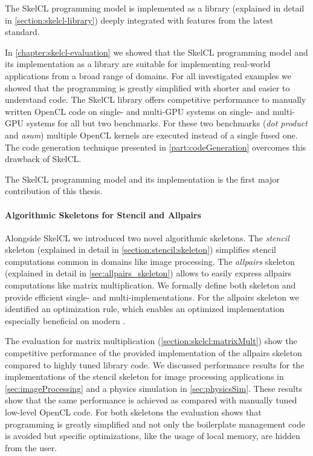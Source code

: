 \noindent
The SkelCL programming model is implemented as a \Cpp library (explained in detail in \autoref{section:skelcl-library}) deeply integrated with features from the latest \Cpp standard.

In \autoref{chapter:skelcl-evaluation} we showed that the SkelCL programming model and its implementation as a \Cpp library are suitable for implementing real-world applications from a broad range of domains.
For all investigated examples we showed that the programming is greatly simplified with shorter and easier to understand code.
The SkelCL library offers competitive performance to manually written OpenCL code on single- and multi-GPU systems on single- and multi-GPU systems for all but two benchmarks.
For these two benchmarks (\emph{dot product} and \emph{asum}) multiple OpenCL kernels are executed instead of a single fused one.
The code generation technique presented in \autoref{part:codeGeneration} overcomes this drawback of SkelCL.

\bigskip
The SkelCL programming model and its implementation is the first major contribution of this thesis.

\paragraph{Algorithmic Skeletons for Stencil and Allpairs}
Alongside SkelCL we introduced two novel algorithmic skeletons.
The \emph{stencil} skeleton (explained in detail in \autoref{section:stencil:skeleton}) simplifies stencil computations common in domains like image processing.
The \emph{allpairs} skeleton (explained in detail in \autoref{sec:allpairs_skeleton}) allows to easily express allpairs computations like matrix multiplication.
We formally define both skeleton and provide efficient single- and multi-\GPU implementations.
For the allpairs skeleton we identified an optimization rule, which enables an optimized implementation especially beneficial on modern \GPUs.

The evaluation for matrix multiplication (\autoref{section:skelcl:matrixMult}) show the competitive performance of the provided implementation of the allpairs skeleton compared to highly tuned library code.
We discussed performance results for the implementations of the stencil skeleton for image processing applications in \autoref{sec:imageProcessing} and a physics simulation in \autoref{sec:physicsSim}.
These results show that the same performance is achieved as compared with manually tuned low-level OpenCL code.
For both skeletons the evaluation shows that programming is greatly simplified and not only the boilerplate management code is avoided but \GPU specific optimizations, like the usage of local memory, are hidden from the user.


